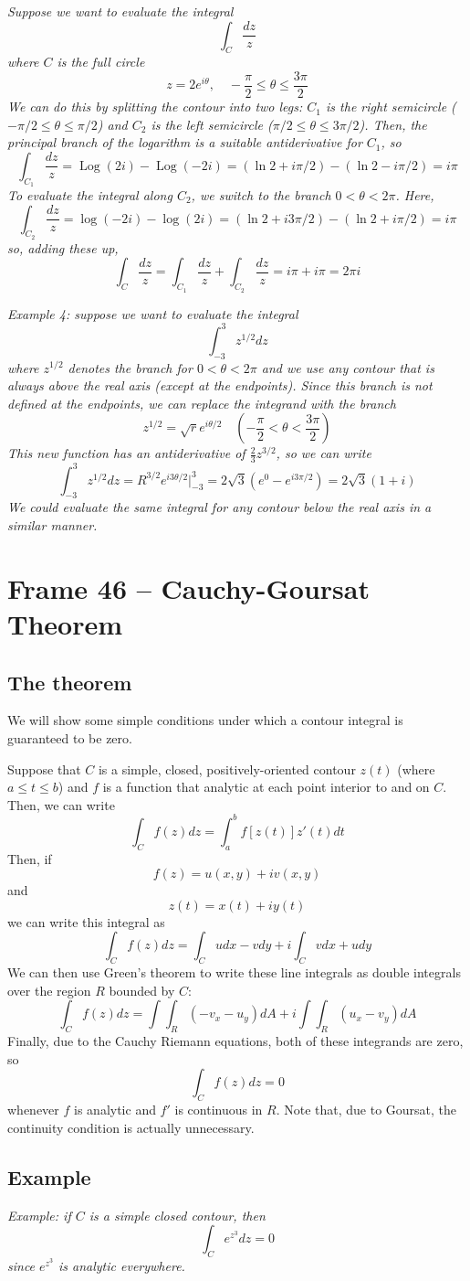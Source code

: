 \documentclass{article}
\DeclareMathOperator{\Log}{Log}
\begin{document}
\textit{Suppose we want to evaluate the integral
\[
	\int_C \frac{dz}{z} 
\]
where $C$ is the full circle
\[
	z = 2e^{i\theta},	\quad -\frac{\pi}{2} \le \theta \le \frac{3\pi}{2}
\]
We can do this by splitting the contour into two legs: $C_1$ is the right semicircle ($-\pi/2 \le \theta \le \pi/2$) and $C_2$ is the left semicircle ($\pi/2 \le \theta \le 3\pi/2$). Then, the principal branch of the logarithm is a suitable antiderivative for $C_1$, so
\[
	\int_{C_1} \frac{dz}{z}
	= \Log(2i) - \Log(-2i) 
	= (\ln 2 + i\pi/2) - (\ln 2 - i\pi/2)
	= i\pi
\]
To evaluate the integral along $C_2$, we switch to the branch $0 < \theta < 2\pi$. Here,
\[
	\int_{C_2} \frac{dz}{z}
	= \log(-2i) - \log(2i)
	= (\ln 2 + i3\pi/2) - (\ln 2 + i\pi/2) 
	= i\pi
\]
so, adding these up,
\[
	\int_C \frac{dz}{z}
	= \int_{C_1} \frac{dz}{z} + \int_{C_2} \frac{dz}{z} 
	= i \pi + i \pi
	= 2\pi i
\]}

\textit{Example 4: suppose we want to evaluate the integral
\[
	\int_{-3}^{3} z^{1/2} dz
\]
where $z^{1/2}$ denotes the branch for $0 < \theta < 2\pi$ and we use any contour that is always above the real axis (except at the endpoints). Since this branch is not defined at the endpoints, we can replace the integrand with the branch
\[
	z^{1/2} = \sqrt{r} e^{i\theta/2}
	\quad (-\frac{\pi}{2} < \theta < \frac{3\pi}{2})
\]
This new function has an antiderivative of $\frac{2}{3} z^{3/2}$, so we can write
\[
	\int_{-3}^{3} z^{1/2} dz
	= R^{3/2} e^{i3\theta/2} \Big|_{-3}^3
	= 2\sqrt{3} (e^0 - e^{i3\pi/2})
	= 2\sqrt{3} (1 + i)
\]	
We could evaluate the same integral for any contour below the real axis in a similar manner.}


\clearpage
\section{Frame 46 -- Cauchy-Goursat Theorem}
\subsection{The theorem}
We will show some simple conditions under which a contour integral is guaranteed to be zero.

Suppose that $C$ is a simple, closed, positively-oriented contour $z(t)$ (where $a \le t \le b$) and $f$ is a function that analytic at each point interior to and on $C$. Then, we can write
\[
	\int_C f(z) dz = \int_a^b f[z(t)] z'(t) dt
\]
Then, if
\[
	f(z) = u(x, y) + iv(x, y) 
\]
and
\[
	z(t) = x(t) + iy(t)
\]
we can write this integral as
\[
	\int_C f(z) dz = \int_C u dx - v dy + i\int_C v dx + u dy
\]
We can then use Green's theorem to write these line integrals as double integrals over the region $R$ bounded by $C$:
\[
	\int_C f(z) dz 
	=  \int \int_R (-v_x - u_y) dA 
	+ i\int \int_R  (u_x - v_y) dA 
\]
Finally, due to the Cauchy Riemann equations, both of these integrands are zero, so
\[
	\int_C f(z) dz = 0
\]
whenever $f$ is analytic and $f'$ is continuous in $R$. Note that, due to Goursat, the continuity condition is actually unnecessary.

\subsection{Example}
\textit{Example: if $C$ is a simple closed contour, then
\[
	\int_C e^{z^3} dz = 0
\]	
since $e^{z^3}$ is analytic everywhere.}
\end{document}
